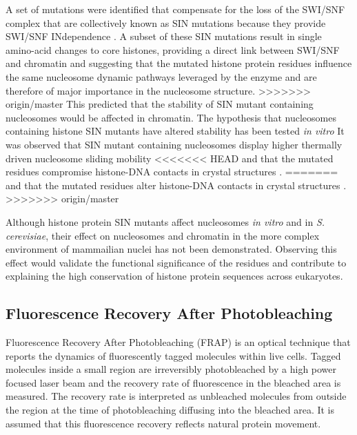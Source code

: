     A set of mutations were identified that compensate
    for the loss of the SWI/SNF complex
    that are collectively known as SIN mutations because they
    provide SWI/SNF INdependence \citep{kruger1995amino}.
    A subset of these SIN mutations result in single amino-acid changes to core histones,
    providing a direct link between SWI/SNF and chromatin and suggesting
    that the mutated histone protein residues influence the same 
    nucleosome dynamic pathways leveraged by the enzyme and are therefore
    of major importance in the nucleosome structure.
>>>>>>> origin/master
    This predicted that the stability of SIN mutant containing nucleosomes would be affected in chromatin.
    The hypothesis that nucleosomes containing histone SIN mutants
    have altered stability has been tested \textit{in vitro}
    It was observed that SIN mutant containing nucleosomes display higher 
    thermally driven nucleosome sliding mobility \citep{flaus2004sin}
<<<<<<< HEAD
    and that the mutated residues compromise histone-DNA contacts in crystal structures .
=======
    and that the mutated residues alter histone-DNA contacts in
    crystal structures \citep{muthurajan2004crystal}.
>>>>>>> origin/master

    Although histone protein SIN mutants affect nucleosomes \textit{in vitro} and in \textit{S. cerevisiae},
    their effect on nucleosomes and chromatin in the more complex environment 
    of mammailian nuclei has not been demonstrated.
    Observing this effect would validate the functional significance of the residues
    and contribute to explaining the high conservation of histone protein sequences across eukaryotes.

  \subsection{Fluorescence Recovery After Photobleaching}

    Fluorescence Recovery After Photobleaching (FRAP) is an optical technique
    that reports the dynamics of fluorescently tagged molecules within live cells.
    Tagged molecules inside a small region are irreversibly photobleached by
    a high power focused laser beam and the recovery rate of fluorescence
    in the bleached area is measured. The recovery rate is interpreted as unbleached molecules
    from outside the region at the time of photobleaching diffusing into the bleached area.
    It is assumed that this fluorescence recovery reflects natural protein movement.

